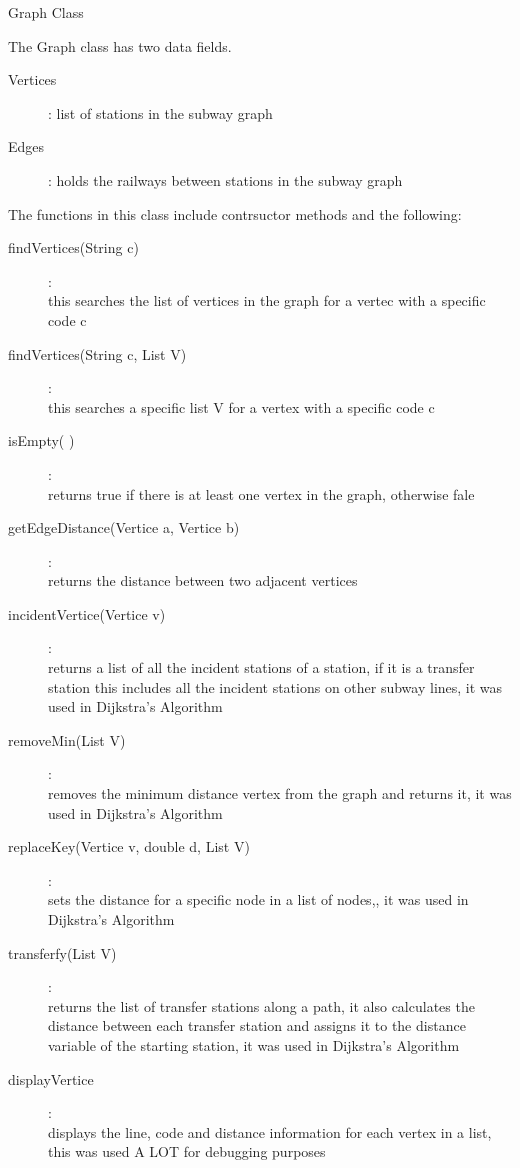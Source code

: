 \documentclass{article}
\begin{document}
\begin{center} Graph Class \end{center}
The Graph class has two data fields.
\begin{description}
	\item[Vertices]: list of stations in the subway graph
	\item[Edges]: holds the railways between stations in the subway graph	
\end{description}

The functions in this class include contrsuctor methods and the following:
\begin{description}
	\item[findVertices(String c)]: \\ \hfill this searches the list of vertices in the graph for a vertec with a specific code c
	\item[findVertices(String c, List V)] :\\ \hfill  this searches a specific list V for a vertex with a specific code c
	\item[isEmpty( )]: \\ \hfill returns true if there is at least one vertex in the graph, otherwise fale
	\item[getEdgeDistance(Vertice a, Vertice b)]: \\ \hfill returns the distance between two adjacent vertices
	\item[incidentVertice(Vertice v)] : \\ \hfill returns a list of all the incident stations of a station, if it is a transfer station this includes all the incident stations on other subway lines, it was used in Dijkstra's Algorithm
	\item[removeMin(List V)] : \\ \hfill removes the minimum distance vertex from the graph and returns it, it was used in Dijkstra's Algorithm
	\item[replaceKey(Vertice v, double d, List  V)]: \\ \hfill sets the distance for a specific node in a list of nodes,, it was used in Dijkstra's Algorithm
	\item[transferfy(List V)] : \\ \hfill returns the list of transfer stations along a path, it also calculates the distance between each transfer station and assigns it to the distance variable of the starting station, it was used in Dijkstra's Algorithm
	\item[displayVertice]: \\ \hfill displays the line, code and distance information for each vertex in a list, this was used A LOT for debugging purposes
\end{description}
\clearpage
\end{document}
